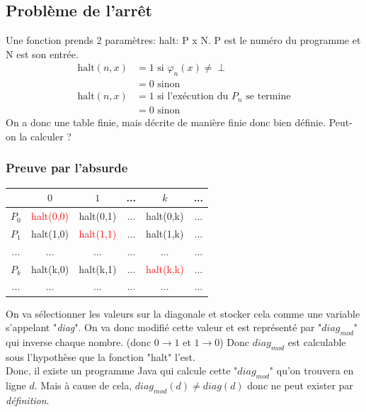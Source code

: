 \documentclass{report}
\begin{document}
\subsection{Problème de l'arrêt}
Une fonction prends 2 paramètres: halt: P x N. P est le numéro du programme et N est son entrée.\\
\begin{align}
\text{halt}(n,x) &= 1 \text{ si } \varphi_n(x) \neq \perp\\
&= 0 \text{ sinon}\\
\text{halt}(n,x) &= 1 \text{ si l'exécution du } P_n \text{ se termine}\\
&= 0 \text{ sinon}
\end{align}
On a donc une table finie, mais décrite de manière finie donc bien définie. Peut-on la calculer ?

\subsubsection{Preuve par l'absurde} 

\begin{center}
\begin{tabular}{|c|c|c|c|c|c|}
\hline
& $0$ & $1$ & ... & $k$& ...\\
\hline
$P_0$ & \textcolor{red}{halt(0,0)} & halt(0,1) & ... & halt(0,k) & ...\\
\hline
$P_1$ & halt(1,0) & \textcolor{red}{halt(1,1)} & ... & halt(1,k) & ...\\
\hline
... & ... & ... & ... & ... & ... \\
\hline
$P_k$ & halt(k,0) & halt(k,1) & ... & \textcolor{red}{halt(k,k)} & ...\\
\hline
... & ... & ... & ... & ... & ... \\
\hline
\end{tabular}
\end{center}

On va sélectionner les valeurs sur la diagonale et stocker cela comme une variable s'appelant "\textit{diag}". On va donc modifié cette valeur et est représenté par "\textit{$diag_{mod}$}" qui inverse chaque nombre. (donc $0 \rightarrow 1$ et $1 \rightarrow 0$) Donc \textit{$diag_{mod}$} est calculable sous l'hypothèse que la fonction "halt" l'est.\\

Donc, il existe un programme Java qui calcule cette "$diag_{mod}$" qu'on trouvera en ligne $d$. Mais à cause de cela, $diag_{mod}(d) \neq diag(d)$ donc ne peut exister par \textit{définition}.\\
\end{document}
